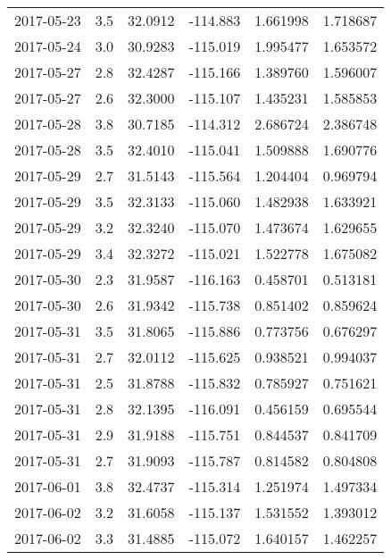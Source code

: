 \begin{tabular}{lrrrrr}
2017-05-23 &       3.5 &  32.0912 &  -114.883 &         1.661998 &         1.718687 \\
2017-05-24 &       3.0 &  30.9283 &  -115.019 &         1.995477 &         1.653572 \\
2017-05-27 &       2.8 &  32.4287 &  -115.166 &         1.389760 &         1.596007 \\
2017-05-27 &       2.6 &  32.3000 &  -115.107 &         1.435231 &         1.585853 \\
2017-05-28 &       3.8 &  30.7185 &  -114.312 &         2.686724 &         2.386748 \\
2017-05-28 &       3.5 &  32.4010 &  -115.041 &         1.509888 &         1.690776 \\
2017-05-29 &       2.7 &  31.5143 &  -115.564 &         1.204404 &         0.969794 \\
2017-05-29 &       3.5 &  32.3133 &  -115.060 &         1.482938 &         1.633921 \\
2017-05-29 &       3.2 &  32.3240 &  -115.070 &         1.473674 &         1.629655 \\
2017-05-29 &       3.4 &  32.3272 &  -115.021 &         1.522778 &         1.675082 \\
2017-05-30 &       2.3 &  31.9587 &  -116.163 &         0.458701 &         0.513181 \\
2017-05-30 &       2.6 &  31.9342 &  -115.738 &         0.851402 &         0.859624 \\
2017-05-31 &       3.5 &  31.8065 &  -115.886 &         0.773756 &         0.676297 \\
2017-05-31 &       2.7 &  32.0112 &  -115.625 &         0.938521 &         0.994037 \\
2017-05-31 &       2.5 &  31.8788 &  -115.832 &         0.785927 &         0.751621 \\
2017-05-31 &       2.8 &  32.1395 &  -116.091 &         0.456159 &         0.695544 \\
2017-05-31 &       2.9 &  31.9188 &  -115.751 &         0.844537 &         0.841709 \\
2017-05-31 &       2.7 &  31.9093 &  -115.787 &         0.814582 &         0.804808 \\
2017-06-01 &       3.8 &  32.4737 &  -115.314 &         1.251974 &         1.497334 \\
2017-06-02 &       3.2 &  31.6058 &  -115.137 &         1.531552 &         1.393012 \\
2017-06-02 &       3.3 &  31.4885 &  -115.072 &         1.640157 &         1.462257 \\

\end{tabular}
